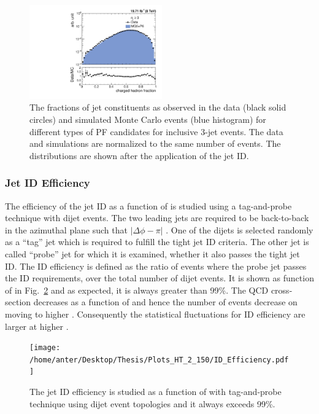 \begin{figure}[!htbp]
\begin{center}
 \vspace*{1mm}
 \includegraphics[width=0.51\textwidth]{Plots_HT_2_150/Comparison_ChHadFrac_3_HT_2_150.pdf}
 \caption[The fractions of jet constituents for different types of PF candidates for inclusive 3-jet events.]{The fractions of jet constituents as observed in the data (black solid circles) and simulated Monte Carlo events (blue histogram) for different types of PF candidates for inclusive 3-jet events. The data and simulations are normalized to the same number of events. The distributions are shown after the application of the jet ID.}
 \label{fig:qual3}
 \end{center}
\end{figure} 

\subsubsection{Jet ID Efficiency}
The efficiency of the jet ID as a function of \httwo is studied using a tag-and-probe technique with dijet events. The two leading jets are required to be back-to-back in the azimuthal plane such that $|\Delta\phi - \pi|$ . One of the dijets is selected randomly as a ``tag'' jet which is required to fulfill the tight jet ID criteria. The other jet is called ``probe'' jet for which it is examined, whether it also passes the tight jet ID. The ID efficiency is defined as the ratio of events where the probe jet passes the ID requirements, over the total number of dijet events. It is shown as function of \httwo in Fig.~\ref{fig:ideff} and as expected, it is always greater than 99\%. The QCD cross-section decreases as a function of \httwo and hence the number of events decrease on moving to higher \httwons. Consequently the statistical fluctuations for ID efficiency are larger at higher \httwons.

\begin{figure}[!htbp]
 \begin{center}
 \texttt{[image: /home/anter/Desktop/Thesis/Plots\_HT\_2\_150/ID\_Efficiency.pdf]}
 \caption[The jet ID efficiency is studied as a function of \httwo with tag-and-probe technique using dijet event topologies and it always exceeds 99\%.]{The jet ID efficiency is studied as a function of \httwo with tag-and-probe technique using dijet event topologies and it always exceeds 99\%.}
 \label{fig:ideff}
 \end{center}
\end{figure} 

